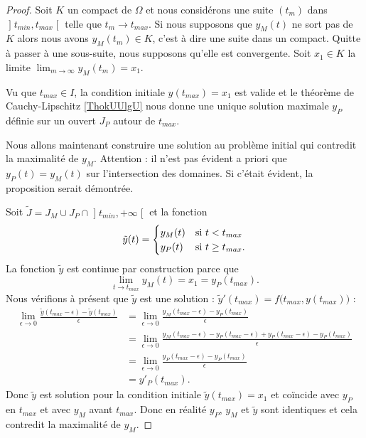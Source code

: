 \begin{proof}
Soit \( K\) un compact de \( \Omega\) et nous considérons une suite \( (t_m)\) dans \( \mathopen] t_{min} , t_{max} \mathclose[\) telle que \( t_m\to t_{max}\). Si nous supposons que \( y_M(t)\) ne sort pas de \( K\) alors nous avons \( y_M(t_m)\in K\), c'est à dire une suite dans un compact. Quitte à passer à une sous-suite, nous supposons qu'elle est convergente. Soit \( x_1\in K\) la limite \( \lim_{m\to \infty}y_M(t_m)=x_1\).

    Vu que \( t_{max}\in I\), la condition initiale \( y(t_{max})=x_1\) est valide et le théorème de Cauchy-Lipschitz \ref{ThokUUlgU} nous donne une unique solution maximale \( y_P\) définie sur un ouvert \( J_P\) autour de \( t_{max}\).

    Nous allons maintenant construire une solution au problème initial qui contredit la maximalité de \( y_M\). Attention : il n'est pas évident a priori que \( y_P(t)=y_M(t)\) sur l'intersection des domaines. Si c'était évident, la proposition serait démontrée.

    Soit \( \tilde J=J_M\cup J_P\cap\mathopen] t_{min} , +\infty \mathclose[\) et la fonction
        \begin{equation}
            \tilde y(t)=\begin{cases}
                y_M(t)    &   \text{si \( t<t_{max}\)}\\
                y_P(t)    &    \text{si \( t\geq t_{max}\)}.
            \end{cases}
        \end{equation}
        La fonction \( \tilde y\) est continue par construction parce que
        \begin{equation}
            \lim_{t\to t_{max}} y_M(t)=x_1=y_P(t_{max}).
        \end{equation}
        Nous vérifions à présent que \( \tilde y\) est une solution : \( \tilde y'(t_{max})=f\big( t_{max},y(t_{max}) \big)\) :
        \begin{subequations}
            \begin{align}
                \lim_{\epsilon\to 0}\frac{ \tilde y(t_{max}-\epsilon)-\tilde y(t_{max}) }{ \epsilon }&=\lim_{\epsilon\to 0}\frac{ y_M(t_{max}-\epsilon)-y_P(t_{max}) }{ \epsilon }\\
                &=\lim_{\epsilon\to 0}\frac{ y_M(t_{max}-\epsilon)-y_P(t_{max}-\epsilon)+y_P(t_{max}-\epsilon)-y_P(t_{max}) }{ \epsilon }\\
                &=\lim_{\epsilon\to 0}\frac{ y_P(t_{max}-\epsilon)-y_P(t_{max}) }{ \epsilon }\\
                &=y'_P(t_{max}).
            \end{align}
        \end{subequations}
        Donc \( \tilde y\) est solution pour la condition initiale \( \tilde y(t_{max})=x_1\) et coïncide avec \( y_P\) en \( t_{max}\) et avec \( y_M\) avant \( t_{max}\). Donc en réalité \( y_P\), \( y_M\) et \( \tilde y\) sont identiques et cela contredit la maximalité de \( y_M\).
\end{proof}

